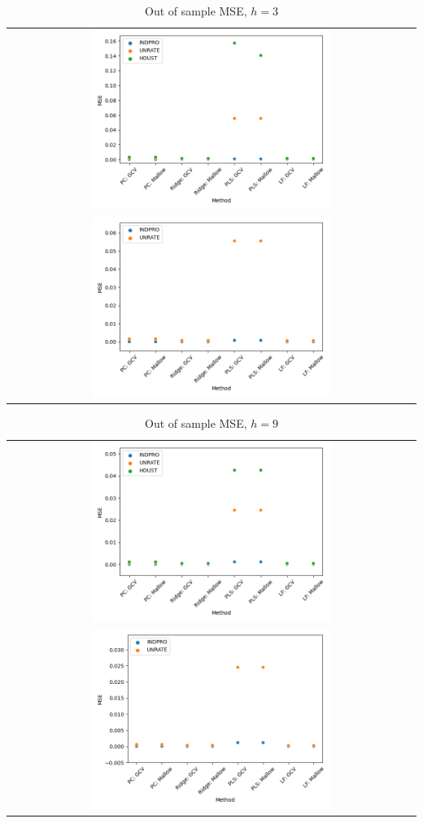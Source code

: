 \begin{table}[]
    \centering
    \begin{tabular}{c}
        \includegraphics[width=0.6\textwidth]{figures/MSE_oos_h3.png} \\
        \includegraphics[width=0.6\textwidth]{figures/MSE_oos_h3_noHOUST.png}
    \end{tabular}
    \caption*{Out of sample MSE, $h = 3$}
\end{table}

\begin{table}[]
    \centering
    \begin{tabular}{c}
        \includegraphics[width=0.6\textwidth]{figures/MSE_oos_h9.png} \\
        \includegraphics[width=0.6\textwidth]{figures/MSE_oos_h9_noHOUST.png}
    \end{tabular}
    \caption*{Out of sample MSE, $h = 9$}
\end{table}


